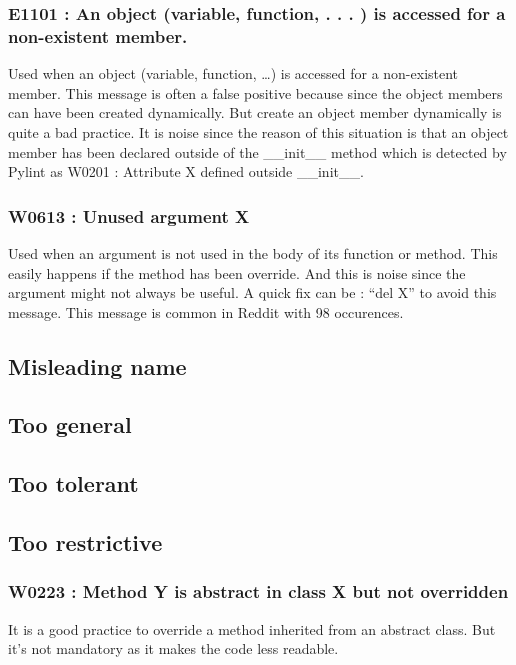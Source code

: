 \documentclass[11pt, a4paper]{article}
\newcommand{\pyl}{\textsf{Pylint}}
\begin{document}
\subsubsection*{E1101 : An object (variable, function, . . . ) is accessed for a non-existent member.}

Used when an object (variable, function, \dots{}) is accessed for a non-existent member.
This message is often a false positive because since the object members can have been created dynamically.
But create an object member dynamically is quite a bad practice.
It is noise since the reason of this situation is that an object member has been declared outside of the __init__ method which is detected by \pyl{} as W0201 : Attribute X defined outside __init__.

\subsubsection*{W0613 : Unused argument X}
Used when an argument is not used in the body of its function or method.
This easily happens if the method has been override.
And this is noise since the argument might not always be useful.
A quick fix can be : ``del X'' to avoid this message.
This message is common in Reddit with 98 occurences.

\subsection*{Misleading name}

\subsection*{Too general}

\subsection*{Too tolerant}

\subsection*{Too restrictive}

\subsubsection*{W0223 : Method Y is abstract in class X but not overridden}

It is a good practice to override a method inherited from an abstract class. 
But it's not mandatory as it makes the code less readable.
\end{document}
